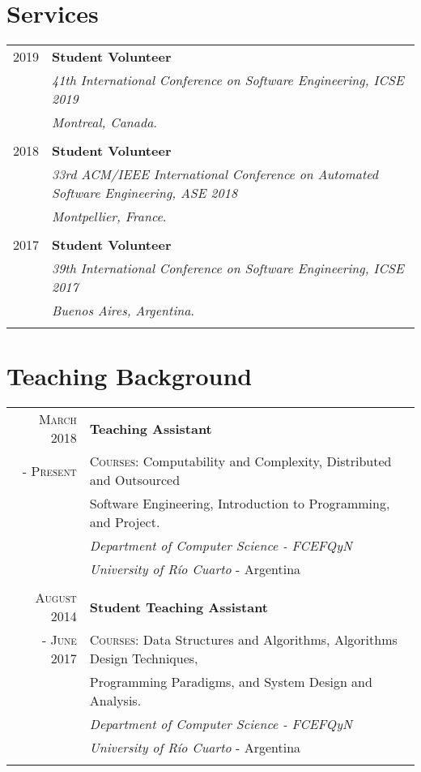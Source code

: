 \documentclass[a4paper,10pt]{article} %
\begin{document}
\section{Services}
\begin{longtable}{rl}
\textsc{2019}	& \textbf{Student Volunteer} \\ 
& \textit{41th International Conference on Software Engineering, ICSE 2019} \\ 
& \textit{Montreal, Canada}. \\ & \\

\textsc{2018}	& \textbf{Student Volunteer} \\
& \textit{33rd ACM/IEEE International Conference on Automated Software Engineering, ASE 2018} \\
& \textit{Montpellier, France}. \\ & \\

\textsc{2017}	& \textbf{Student Volunteer} \\ 
& \textit{39th International Conference on Software Engineering, ICSE 2017} \\ 
& \textit{Buenos Aires, Argentina}. \\ & \\
\end{longtable}

\section{Teaching Background}
\begin{longtable}{rl}

\textsc{March 2018} & \textbf{Teaching Assistant} \\
\textsc{- Present} & \textsc{Courses:} Computability and Complexity, Distributed and Outsourced \\
& Software Engineering, Introduction to Programming, and Project. \\
& \textit{Department of Computer Science - FCEFQyN} \\
& \textit{University of Río Cuarto} - Argentina \\ & \\

\textsc{August 2014} & \textbf{Student Teaching Assistant} \\
\textsc{- June 2017} & \textsc{Courses:} Data Structures and Algorithms, Algorithms Design Techniques, \\
& Programming Paradigms, and System Design and Analysis. \\
& \textit{Department of Computer Science - FCEFQyN} \\
& \textit{University of Río Cuarto} - Argentina \\ & \\

\end{longtable}
\end{document}
